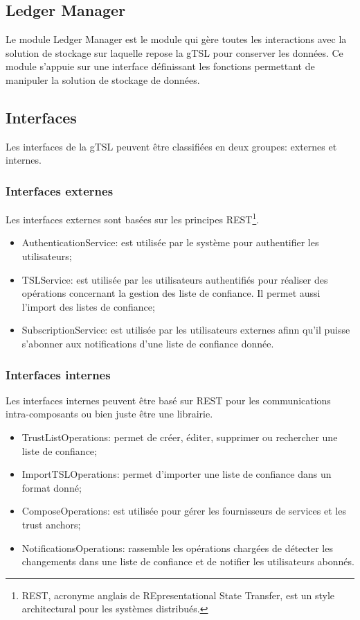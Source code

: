 \documentclass{tnreport}
\begin{document}
\subsection{Ledger Manager}

Le module Ledger Manager est le module qui gère toutes les interactions avec la solution de stockage sur laquelle repose la gTSL pour conserver les données. Ce module s'appuie sur une interface définissant les fonctions permettant de manipuler la solution de stockage de données.

\subsection{Interfaces}

Les interfaces de la gTSL peuvent être classifiées en deux groupes: externes et internes.

\subsubsection{Interfaces externes}

Les interfaces externes sont basées sur les principes REST\footnote{REST, acronyme anglais de REpresentational State Transfer, est un style architectural pour les systèmes distribués.}.

\begin{itemize}
	\item AuthenticationService: est utilisée par le système pour authentifier les utilisateurs;
	\item TSLService: est utilisée par les utilisateurs authentifiés pour réaliser des opérations concernant la gestion des liste de confiance. Il permet aussi l'import des listes de confiance;
	\item SubscriptionService: est utilisée par les utilisateurs externes afinn qu'il puisse s'abonner aux notifications d'une liste de confiance donnée.
\end{itemize}

\subsubsection{Interfaces internes}

Les interfaces internes peuvent être basé sur REST pour les communications intra-composants ou bien juste être une librairie.

\begin{itemize}
	\item TrustListOperations: permet de créer, éditer, supprimer ou rechercher une liste de confiance;
	\item ImportTSLOperations: permet d'importer une liste de confiance dans un format donné;
	\item ComposeOperations: est utilisée pour gérer les fournisseurs de services et les trust anchors;
	\item NotificationsOperations: rassemble les opérations chargées de détecter les changements dans une liste de confiance et de notifier les utilisateurs abonnés.
\end{itemize}
\end{document}
